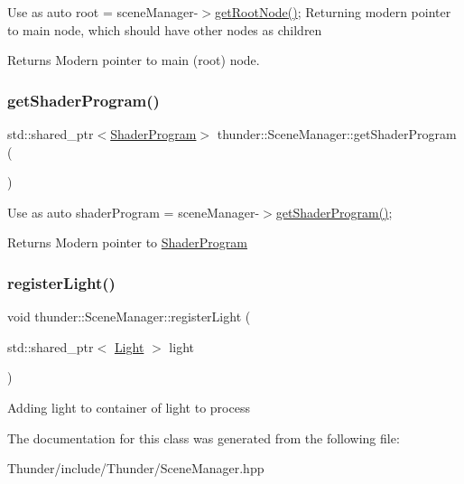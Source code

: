 Use as {\ttfamily auto root = scene\+Manager-\/$>$\mbox{\hyperlink{classthunder_1_1_scene_manager_a3cc5d2cbec1cb527ef71895c1ced1081}{get\+Root\+Node()}};} Returning modern pointer to main node, which should have other nodes as children

\begin{DoxyReturn}{Returns}
Modern pointer to main (root) node. 
\end{DoxyReturn}
\mbox{\label{classthunder_1_1_scene_manager_a02d3980415c0889e3625c7d508e48a73}} 
\subsubsection{\texorpdfstring{get\+Shader\+Program()}{getShaderProgram()}}
{\footnotesize\ttfamily std\+::shared\+\_\+ptr$<$\mbox{\hyperlink{classthunder_1_1_shader_program}{Shader\+Program}}$>$ thunder\+::\+Scene\+Manager\+::get\+Shader\+Program (\begin{DoxyParamCaption}{ }\end{DoxyParamCaption})}

Use as {\ttfamily auto shader\+Program = scene\+Manager-\/$>$\mbox{\hyperlink{classthunder_1_1_scene_manager_a02d3980415c0889e3625c7d508e48a73}{get\+Shader\+Program()}};} \begin{DoxyReturn}{Returns}
Modern pointer to \mbox{\hyperlink{classthunder_1_1_shader_program}{Shader\+Program}} 
\end{DoxyReturn}
\mbox{\label{classthunder_1_1_scene_manager_a858ed05d43e2331bbf531ca6984c025f}} 
\subsubsection{\texorpdfstring{register\+Light()}{registerLight()}}
{\footnotesize\ttfamily void thunder\+::\+Scene\+Manager\+::register\+Light (\begin{DoxyParamCaption}\item[{std\+::shared\+\_\+ptr$<$ \mbox{\hyperlink{classthunder_1_1_light}{Light}} $>$}]{light }\end{DoxyParamCaption})}

Adding light to container of light to process 

The documentation for this class was generated from the following file\+:\begin{DoxyCompactItemize}
\item 
Thunder/include/\+Thunder/Scene\+Manager.\+hpp\end{DoxyCompactItemize}
